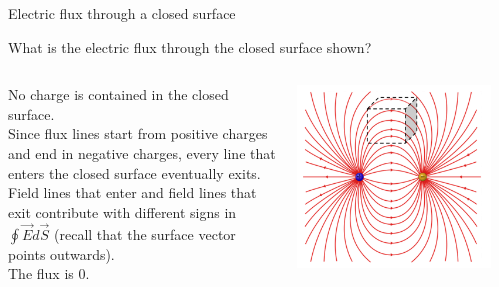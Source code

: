 %
%
%

\begin{frame}{Electric flux through a closed surface}

\begin{center}
 What is the electric flux through the closed surface shown?\\
\end{center}
\vspace{0.2cm}

\begin{columns}
  \begin{column}{0.38\textwidth}
   {\small
     No charge is contained in the closed surface.\\
     \vspace{0.2cm}
     Since flux lines start from positive charges and end in negative charges,
     every line that enters the closed surface eventually exits.\\
     \vspace{0.2cm}
     Field lines that enter and field lines that exit contribute with different signs in $\oint \vec{E} d\vec{S}$
     (recall that the surface vector points outwards).\\
     \vspace{0.2cm}
     The flux is 0.
   }
   \begin{center}
   \end{center}
  \end{column}
  \begin{column}{0.62\textwidth}
    \includegraphics[width=0.90\textwidth]{./images/schematics/electric_dipole_field_lines_closed_surf_noq.png}\\
  \end{column}
\end{columns}
\end{frame}


